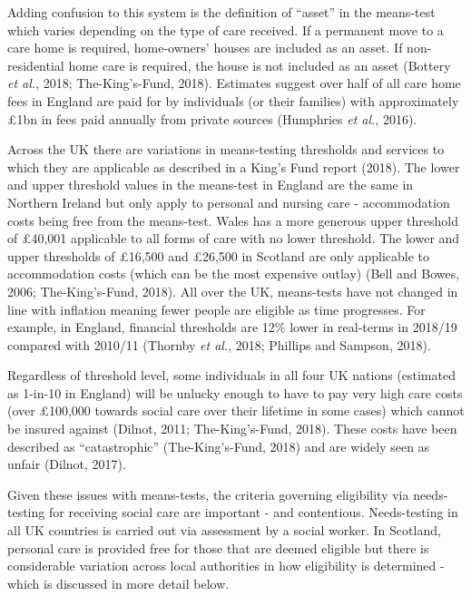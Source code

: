 \documentclass[12pt,a4paper,oneside,table]{report}
\begin{document}
Adding confusion to this system is the definition of ``asset'' in the
means-test which varies depending on the type of care received. If a
permanent move to a care home is required, home-owners' houses are
included as an asset. If non-residential home care is required, the
house is not included as an asset (Bottery \emph{et al.}, 2018;
The-King's-Fund, 2018). Estimates suggest over half of all care home
fees in England are paid for by individuals (or their families) with
approximately £1bn in fees paid annually from private sources (Humphries
\emph{et al.}, 2016).

Across the UK there are variations in means-testing thresholds and
services to which they are applicable as described in a King's Fund
report (2018). The lower and upper threshold values in the means-test in
England are the same in Northern Ireland but only apply to personal and
nursing care - accommodation costs being free from the means-test. Wales
has a more generous upper threshold of £40,001 applicable to all forms
of care with no lower threshold. The lower and upper thresholds of
£16,500 and £26,500 in Scotland are only applicable to accommodation
costs (which can be the most expensive outlay) (Bell and Bowes, 2006;
The-King's-Fund, 2018). All over the UK, means-tests have not changed in
line with inflation meaning fewer people are eligible as time
progresses. For example, in England, financial thresholds are 12\% lower
in real-terms in 2018/19 compared with 2010/11 (Thornby \emph{et al.},
2018; Phillips and Sampson, 2018).

Regardless of threshold level, some individuals in all four UK nations
(estimated as 1-in-10 in England) will be unlucky enough to have to pay
very high care costs (over £100,000 towards social care over their
lifetime in some cases) which cannot be insured against (Dilnot, 2011;
The-King's-Fund, 2018). These costs have been described as
``catastrophic'' (The-King's-Fund, 2018) and are widely seen as unfair
(Dilnot, 2017).

Given these issues with means-tests, the criteria governing eligibility
via needs-testing for receiving social care are important - and
contentious. Needs-testing in all UK countries is carried out via
assessment by a social worker. In Scotland, personal care is provided
free for those that are deemed eligible but there is considerable
variation across local authorities in how eligibility is determined -
which is discussed in more detail below.
\end{document}
